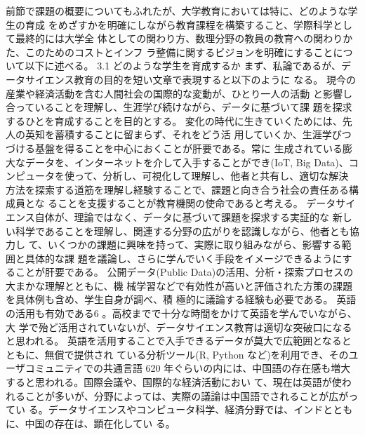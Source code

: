 \documentclass[
]{book}
\theoremstyle{definition}
\theoremstyle{definition}
\theoremstyle{definition}
\theoremstyle{definition}
\theoremstyle{remark}
\begin{document}
前節で課題の概要についてもふれたが、大学教育においては特に、どのような学生の育成 をめざすかを明確にしながら教育課程を構築すること、学際科学として最終的には大学全 体としての関わり方、数理分野の教員の教育への関わりかた、このためのコストとインフ ラ整備に関するビジョンを明確にすることについて以下に述べる。
3.1 どのような学生を育成するか まず、私論であるが、データサイエンス教育の目的を短い文章で表現すると以下のように
なる。
現今の産業や経済活動を含む人間社会の国際的な変動が、ひとり一人の活動 と影響し合っていることを理解し、生涯学び続けながら、データに基づいて課 題を探求するひとを育成することを目的とする。
変化の時代に生きていくためには、先人の英知を蓄積することに留まらず、それをどう活 用していくか、生涯学びつづける基盤を得ることを中心におくことが肝要である。常に 生成されている膨大なデータを、インターネットを介して入手することができ(IoT, Big Data)、コンピュータを使って、分析し、可視化して理解し、他者と共有し、適切な解決 方法を探索する道筋を理解し経験することで、課題と向き合う社会の責任ある構成員とな ることを支援することが教育機関の使命であると考える。
データサイエンス自体が、理論ではなく、データに基づいて課題を探求する実証的な 新しい科学であることを理解し、関連する分野の広がりを認識しながら、他者とも協力し て、いくつかの課題に興味を持って、実際に取り組みながら、影響する範囲と具体的な課 題を議論し、さらに学んでいく手段をイメージできるようにすることが肝要である。
公開データ(Public Data)の活用、分析・探索プロセスの大まかな理解とともに、機 械学習などで有効性が高いと評価された方策の課題を具体例も含め、学生自身が調べ、積 極的に議論する経験も必要である。
英語の活用も有効である6 。高校までで十分な時間をかけて英語を学んでいながら、大 学で殆ど活用されていないが、データサイエンス教育は適切な突破口になると思われる。 英語を活用することで入手できるデータが莫大で広範囲となるとともに、無償で提供され ている分析ツール(R, Python など)を利用でき、そのユーザコミュニティでの共通言語
620 年ぐらいの内には、中国語の存在感も増大すると思われる。国際会議や、国際的な経済活動におい て、現在は英語が使われることが多いが、分野によっては、実際の議論は中国語でされることが広がってい る。データサイエンスやコンピュータ科学、経済分野では、インドとともに、中国の存在は、顕在化してい る。
\end{document}
